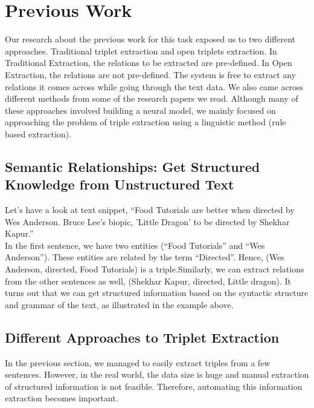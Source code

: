 \documentclass[11pt,letterpaper]{article}
\begin{document}
\section{Previous Work}
Our research about the previous work for this task exposed us to two different approaches. Traditional triplet extraction and open triplets extraction. In Traditional Extraction, the relations to be extracted are pre-defined. In Open Extraction, the relations are not pre-defined. The system is free to extract any relations it comes across while going through the text data. We also came across different methods from some of the research papers we read. Although many of these approaches involved building a neural model, we mainly focused on approaching the problem of triple extraction using a linguistic method (rule based extraction).

\subsection{Semantic Relationships: Get Structured Knowledge from Unstructured Text}
Let's have a look at text snippet, “Food Tutorials are better when directed by Wes Anderson. Bruce Lee's biopic, 'Little Dragon' to be directed by Shekhar Kapur.” \\

In the first sentence, we have two entities (“Food Tutorials” and “Wes Anderson”). These entities are related by the term “Directed”. Hence, (Wes Anderson, directed, Food Tutorials) is a triple.Similarly, we can extract relations from the other sentences as well, (Shekhar Kapur, directed, Little dragon). It turns out that we can get structured information based on the syntactic structure and grammar of the text, as illustrated in the example above.

\subsection{Different Approaches to Triplet Extraction}
In the previous section, we managed to easily extract triples from a few sentences. However, in the real world, the data size is huge and manual extraction of structured information is not feasible. Therefore, automating this information extraction becomes important.\\
\end{document}
